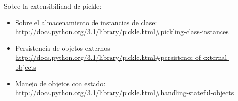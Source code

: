 \pagebreak[3]
\noindent Sobre la extensibilidad de pickle:
\nopagebreak[4]
\begin{itemize}

\item Sobre el almacenamiento de instancias de clase: \newline
\href{http://docs.python.org/3.1/library/pickle.html\#pickling-class-instances}{http://docs.python.org/3.1/library/pickle.html\#pickling-class-instances}

\item Persistencia de objetos externos: \newline
\href{http://docs.python.org/3.1/library/pickle.html\#persistence-of-external-objects}{http://docs.python.org/3.1/library/pickle.html\#persistence-of-external-objects}

\item Manejo de objetos con estado: \newline
\href{http://docs.python.org/3.1/library/pickle.html\#handling-stateful-objects}{http://docs.python.org/3.1/library/pickle.html\#handling-stateful-objects}

\end{itemize}
